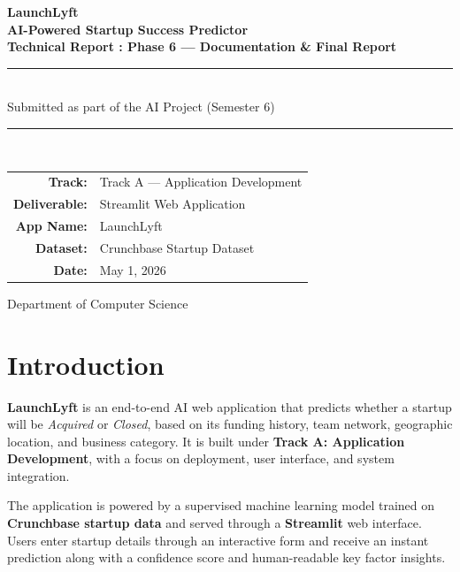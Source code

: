 \documentclass[12pt,a4paper]{article}
\begin{document}
\begin{titlepage}
    \centering
    \vspace*{1.5cm}
    {\LARGE\bfseries LaunchLyft\\[0.4em]
     \large AI-Powered Startup Success Predictor}\\[2cm]

    {\large\textbf{Technical Report : Phase 6 --- Documentation \& Final Report}}\\[1cm]

    \rule{\linewidth}{0.5pt}\\[0.5cm]
    {\large Submitted as part of the AI Project (Semester 6)}\\[0.3cm]
    \rule{\linewidth}{0.5pt}\\[2cm]

    \begin{tabular}{rl}
        \textbf{Track:}        & Track A --- Application Development \\[4pt]
        \textbf{Deliverable:}  & Streamlit Web Application \\[4pt]
        \textbf{App Name:}     & LaunchLyft \\[4pt]
        \textbf{Dataset:}      & Crunchbase Startup Dataset \\[4pt]
        \textbf{Date:}         & May 1, 2026 \\
    \end{tabular}

    \vfill
    {\small Department of Computer Science}
\end{titlepage}

\tableofcontents
\newpage

\section{Introduction}

\textbf{LaunchLyft} is an end-to-end AI web application that predicts whether a
startup will be \textit{Acquired} or \textit{Closed}, based on its funding history,
team network, geographic location, and business category. It is built under
\textbf{Track A: Application Development}, with a focus on deployment, user
interface, and system integration.

The application is powered by a supervised machine learning model trained on
\textbf{Crunchbase startup data} and served through a \textbf{Streamlit} web
interface. Users enter startup details through an interactive form and receive
an instant prediction along with a confidence score and human-readable key
factor insights.
\end{document}
